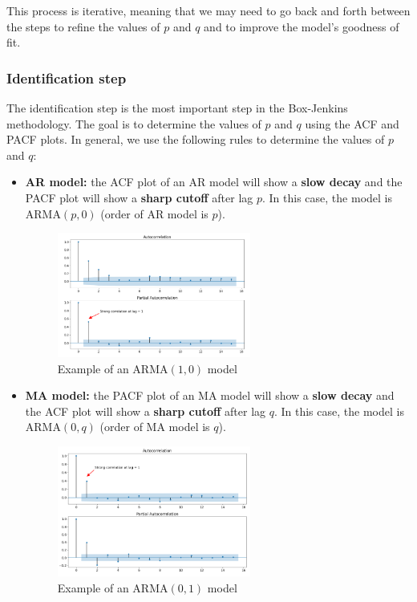 This process is iterative, meaning that we may need to go back and forth between the
steps to refine the values of $p$ and $q$ and to improve the model's goodness of fit.

\subsubsection{Identification step}

The identification step is the most important step in the Box-Jenkins methodology.
The goal is to determine the values of $p$ and $q$ using the ACF and PACF plots. In
general, we use the following rules to determine the values of $p$ and $q$:

\begin{itemize}
    \item \textbf{AR model:} the ACF plot of an AR model will show a \textbf{slow decay}
    and the PACF plot will show a \textbf{sharp cutoff} after lag $p$. In this case,
    the model is ARMA$(p, 0)$ (order of AR model is $p$).

    \begin{figure}[H]
        \centering
        \includegraphics[width=0.6\textwidth]{figures/ARMA_1_0.png}
        \caption{Example of an ARMA$(1, 0)$ model}
        \label{fig:arma_1_0}
    \end{figure}


    \item \textbf{MA model:} the PACF plot of an MA model will show a \textbf{slow decay}
    and the ACF plot will show a \textbf{sharp cutoff} after lag $q$. In this case,
    the model is ARMA$(0, q)$ (order of MA model is $q$).

    \begin{figure}[H]
        \centering
        \includegraphics[width=0.6\textwidth]{figures/ARMA_0_1.png}
        \caption{Example of an ARMA$(0, 1)$ model}
        \label{fig:arma_0_1}
    \end{figure}
\end{itemize}

